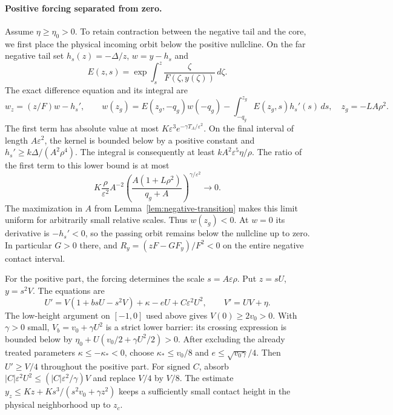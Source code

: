 \paragraph{Positive forcing separated from zero.}
Assume $\eta\ge\eta_0>0$. To retain contraction between the negative
tail and the core, we first place the physical incoming orbit below
the positive nullcline.
On the far negative tail set
$h_s(z)=-\Delta/z$, $w=y-h_s$ and
\[
 E(z,s)=\exp\!\int_s^z\frac{\zeta}{F(\zeta,y(\zeta))}\,d\zeta.
\]
The exact difference equation and its integral are
\begin{equation}\label{eq:simple-radial-incidence}
 w_z=(z/F)w-h_s',\qquad
 w(z_g)=E(z_g,-q_g)w(-q_g)
                 -\int_{-q_g}^{z_g}E(z_g,s)h_s'(s)\,ds,
 \quad z_g=-LA\rho^2 .
\end{equation}
The first term has absolute value at most
$K\varepsilon^3 e^{-\gamma T_A/\varepsilon^2}$.
On the final interval of length $A\varepsilon^2$,
the kernel is bounded below by a positive constant and
$h_s'\ge k\Delta/(A^2\rho^4)$.
The integral is consequently at least
$k A^2\varepsilon^5\eta/\rho$.
The ratio of the first term to this lower bound is at most
\[
 K\frac{\rho}{\varepsilon^2}A^{-2}
    \left(\frac{A(1+L\rho^2)}{q_g+A}\right)^{\gamma/\varepsilon^2}
       \longrightarrow0.
\]
The maximization in $A$ from Lemma~\ref{lem:negative-transition}
makes this limit uniform for arbitrarily small relative scales.
Thus $w(z_g)<0$. At $w=0$ its derivative is
$-h_s'<0$, so the passing orbit remains below the nullcline up to zero.
In particular $G>0$ there, and
$R_y=(zF-GF_y)/F^2<0$ on the entire negative contact interval.

For the positive part, the forcing determines the scale
$s=A\varepsilon\rho$. Put
$z=sU$, $y=s^2V$.  The equations are
\begin{equation}\label{eq:simple-radial-core}
 U'=V(1+bsU-s^2V)+\kappa-eU+C\varepsilon^2U^2,\qquad
 V'=UV+\eta.
\end{equation}
The low-height argument on $[-1,0]$ used above gives
$V(0)\ge2v_0>0$.  With $\gamma>0$ small,
$V_b=v_0+\gamma U^2$ is a strict lower barrier: its crossing
expression is bounded below by
$\eta_0+U(v_0/2+\gamma U^2/2)>0$.
After excluding the already treated parameters
$\kappa\le-\kappa_*<0$, choose
$\kappa_*\le v_0/8$ and $e\le\sqrt{v_0\gamma}/4$.
Then $U'\ge V/4$ throughout the positive part.
For signed $C$, absorb
$|C|\varepsilon^2U^2\le(|C|\varepsilon^2/\gamma)V$
and replace $V/4$ by $V/8$.
The estimate
$y_z\le Kz+K s^3/(s^2v_0+\gamma z^2)$ keeps a sufficiently small
contact height in the physical neighborhood up to $z_c$.

